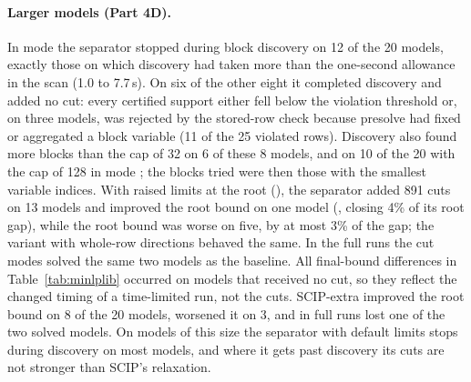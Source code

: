 \paragraph{Larger models (Part 4D).} In mode  the separator stopped
during block discovery on 12 of the 20 models, exactly those on which
discovery had taken more than the one-second allowance in the scan (1.0 to
7.7\,s). On six of the other eight it completed discovery and added no cut:
every certified support either fell below the violation threshold or, on three
models, was rejected by the stored-row check because presolve had fixed or
aggregated a block variable (11 of the 25 violated rows). Discovery also
found more blocks than the cap of 32 on 6 of these 8 models, and on 10 of the
20 with the cap of 128 in mode ; the blocks tried were then
those with the smallest variable indices. With raised limits
at the root (), the separator added 891 cuts on 13 models and
improved the root bound on one model (, closing 4\%
of its root gap), while the root bound was worse on five, by at most 3\% of the
gap; the variant with whole-row directions behaved the same. In the full runs
the cut modes solved the same two models as the baseline. All final-bound
differences in Table~\ref{tab:minlplib} occurred on models that received no
cut, so they reflect the changed timing of a time-limited run, not the cuts.
SCIP-extra improved the root bound on 8 of the 20 models, worsened it on 3,
and in full runs lost one of the two solved models. On models of this size the
separator with default limits stops during discovery on most models, and
where it gets past discovery its cuts are not stronger than SCIP's
relaxation.
